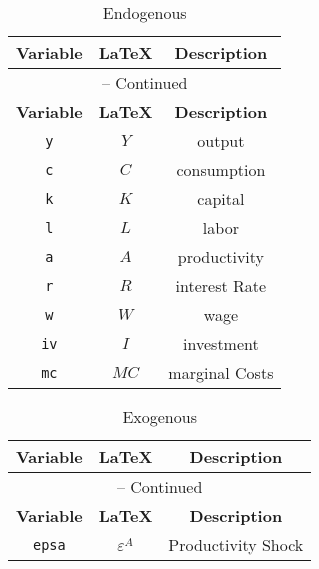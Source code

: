 \begin{center}
\begin{longtable}{ccc}
\caption{Endogenous}\\%
\hline%
\multicolumn{1}{c}{\textbf{Variable}} &
\multicolumn{1}{c}{\textbf{\LaTeX}} &
\multicolumn{1}{c}{\textbf{Description}}\\%
\hline\hline%
\endfirsthead
\multicolumn{3}{c}{{\tablename} \thetable{} -- Continued}\\%
\hline%
\multicolumn{1}{c}{\textbf{Variable}} &
\multicolumn{1}{c}{\textbf{\LaTeX}} &
\multicolumn{1}{c}{\textbf{Description}}\\%
\hline\hline%
\endhead
\texttt{y} & ${Y}$ & output\\
\texttt{c} & ${C}$ & consumption\\
\texttt{k} & ${K}$ & capital\\
\texttt{l} & ${L}$ & labor\\
\texttt{a} & ${A}$ & productivity\\
\texttt{r} & ${R}$ & interest Rate\\
\texttt{w} & ${W}$ & wage\\
\texttt{iv} & ${I}$ & investment\\
\texttt{mc} & ${MC}$ & marginal Costs\\
\hline%
\end{longtable}
\end{center}
\begin{center}
\begin{longtable}{ccc}
\caption{Exogenous}\\%
\hline%
\multicolumn{1}{c}{\textbf{Variable}} &
\multicolumn{1}{c}{\textbf{\LaTeX}} &
\multicolumn{1}{c}{\textbf{Description}}\\%
\hline\hline%
\endfirsthead
\multicolumn{3}{c}{{\tablename} \thetable{} -- Continued}\\%
\hline%
\multicolumn{1}{c}{\textbf{Variable}} &
\multicolumn{1}{c}{\textbf{\LaTeX}} &
\multicolumn{1}{c}{\textbf{Description}}\\%
\hline\hline%
\endhead
\texttt{epsa} & ${\varepsilon^A}$ & Productivity Shock\\
\hline%
\end{longtable}
\end{center}
